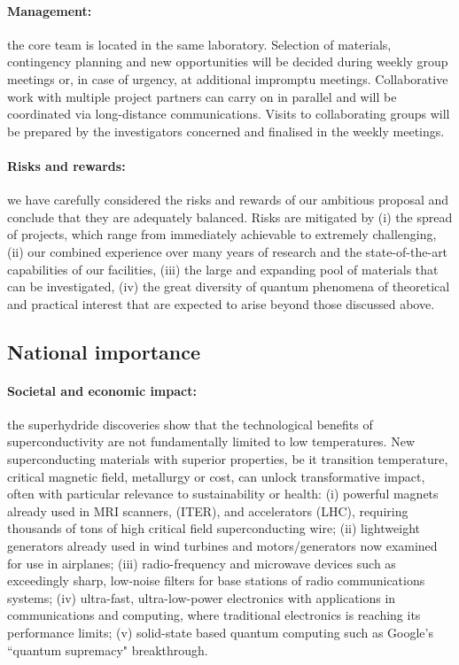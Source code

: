 \paragraph{Management:} 
the core team is located in
the same laboratory. %
Selection of materials, contingency planning and new
opportunities will be decided during weekly group meetings or,
in case of urgency, at additional impromptu meetings.  Collaborative
work with multiple project partners can carry on in parallel and will
be coordinated via long-distance communications. 
Visits to collaborating groups will be
prepared by the investigators concerned and finalised in the weekly 
meetings.

\paragraph{Risks and rewards:} we have carefully considered the risks and
rewards of our ambitious proposal and conclude that they are
adequately balanced. Risks are mitigated by (i) the spread of
projects, which range from immediately achievable to extremely
challenging, (ii) our combined experience over many years of research
and the state-of-the-art capabilities of our facilities, (iii) the large
and expanding pool of materials that can be investigated, (iv) the
great diversity of quantum phenomena of theoretical and practical
interest that are expected to arise beyond those discussed above.



\subsection*{National importance}
\paragraph{Societal and economic impact:}
the superhydride discoveries show that the technological benefits of superconductivity are not fundamentally limited to low temperatures. 
New superconducting materials with superior properties, be it transition temperature,
critical magnetic field, metallurgy or cost, 
can unlock transformative impact, often with particular relevance to sustainability or health: 
(i) powerful magnets already used in MRI scanners, %
  (ITER), and accelerators (LHC), requiring  thousands of tons of high critical field superconducting wire; 
(ii) lightweight generators already used in wind turbines and motors/generators now examined for use in airplanes;   
(iii) radio-frequency and microwave devices such as exceedingly sharp, low-noise filters for base stations of radio communications systems; 
(iv) ultra-fast, ultra-low-power electronics with applications in communications and computing, where traditional electronics is reaching its performance limits; 
(v) solid-state based quantum computing such as Google's ``quantum supremacy" breakthrough.

